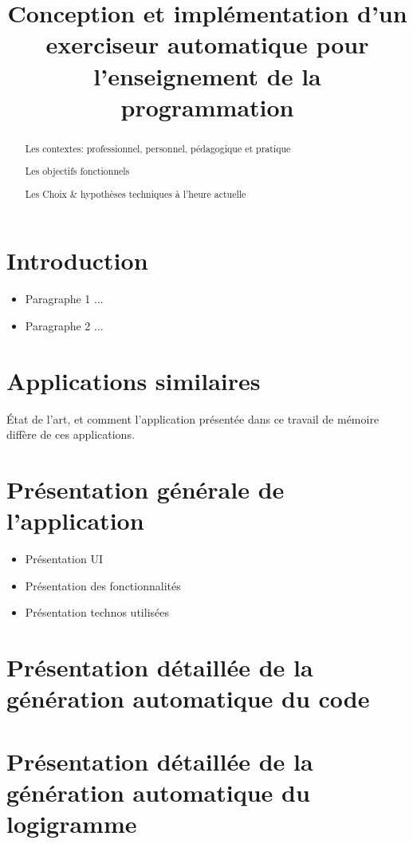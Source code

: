 \documentclass[11pt,a4paper]{article}
\title{\textbf{Conception et implémentation d'un exerciseur automatique pour l'enseignement de la programmation}}
\author{ }
\date{}
\begin{document}
\maketitle

\begin{abstract}
Les contextes: professionnel, personnel, pédagogique et pratique
\par
Les objectifs fonctionnels
\par
Les Choix \& hypothèses techniques à l'heure actuelle
\end{abstract}

\tableofcontents

\section{Introduction}
\begin{itemize}
    \item Paragraphe 1 ...
    \item Paragraphe 2 ...
\end{itemize}

\section{Applications similaires}
État de l'art, et comment l'application présentée dans ce travail de mémoire diffère de ces applications.

\section{Présentation générale de l'application}
\begin{itemize}
    \item Présentation UI
    \item Présentation des fonctionnalités
    \item Présentation technos utilisées
\end{itemize}

\section{Présentation détaillée de la génération automatique du code}

\section{Présentation détaillée de la génération automatique du logigramme}
\end{document}
